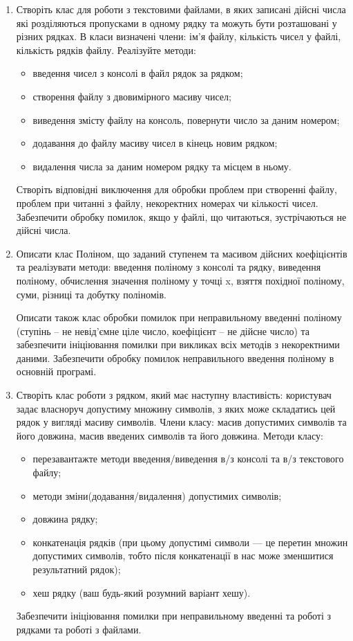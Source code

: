 \documentclass[a5paper,titlepage,openany,twoside,
]
{book_unv}%
\begin{document}
\begin{enumerate}
\begin{enumerate}
\begin{enumerate}
\item
Створіть клас для роботи з текстовими файлами, в яких записані дійсні числа
які розділяються пропусками в одному рядку та можуть бути розташовані у
різних рядках.
В класи визначені члени: ім'я файлу, кількість чисел у файлі, кількість рядків файлу.
Реалізуйте методи:
\begin{itemize}
\item
введення чисел з консолі в файл рядок за рядком;
\item
створення файлу з двовимірного масиву чисел;
\item
виведення змісту файлу на консоль, повернути число за даним номером; 
\item
додавання до файлу масиву чисел в кінець новим рядком; 
\item
видалення числа за даним номером рядку та місцем в ньому.
\end{itemize}

Створіть відповідні виключення для обробки проблем при створенні файлу,
проблем при читанні з файлу, некоректних номерах чи кількості чисел.
Забезпечити обробку помилок, якщо у файлі, що читаються, 
зустрічаються не дійсні числа.

\item

Описати клас Поліном, що заданий ступенем та масивом дійсних коефіцієнтів
та реалізувати методи: введення поліному з консолі та рядку,
виведення поліному, обчислення значення поліному у точці x, взяття
похідної поліному, суми, різниці та добутку поліномів.

Описати також клас обробки помилок при неправильному введенні поліному
(ступінь -- не невід'ємне ціле число, коефіцієнт -- не дійсне число) та
забезпечити ініціювання помилки при викликах всіх методів з некоректними даними.
Забезпечити обробку помилок неправильного введення поліному в основній програмі.

\item
Створіть клас роботи з рядком, який має наступну властивість: 
користувач задає власноруч допустиму множину символів, з яких може складатись цей рядок
у вигляді масиву символів. Члени класу: масив допустимих символів та його довжина,
масив введених символів та його довжина.
Методи класу:
\begin{itemize}
\item
перезавантажте методи введення/виведення в/з консолі та в/з текстового файлу;
\item
методи зміни(додавання/видалення) допустимих символів;
\item
довжина рядку;
\item
конкатенація рядків (при цьому допустимі символи --- це перетин 
множин допустимих символів, 
тобто після конкатенації в нас може зменшитися результатний рядок);
\item
хеш рядку (ваш будь-який розумний варіант хешу).
\end{itemize}
Забезпечити ініціювання помилки при неправильному введенні та роботі з рядками 
та роботі з файлами.


\end{enumerate}
\end{enumerate}
\end{enumerate}
\end{document}
